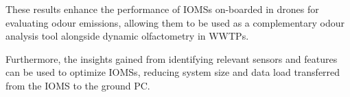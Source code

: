 \documentclass[final,3p,times,twocolumn]{elsarticle}
\begin{document}
These results enhance the performance of IOMSs on-boarded in drones for evaluating odour emissions, allowing them to be used as a complementary odour analysis tool alongside dynamic olfactometry in WWTPs.

Furthermore, the insights gained from identifying relevant sensors and features can be used to optimize IOMSs, reducing system size and data load transferred from the IOMS to the ground PC.



  
 





\end{document}
